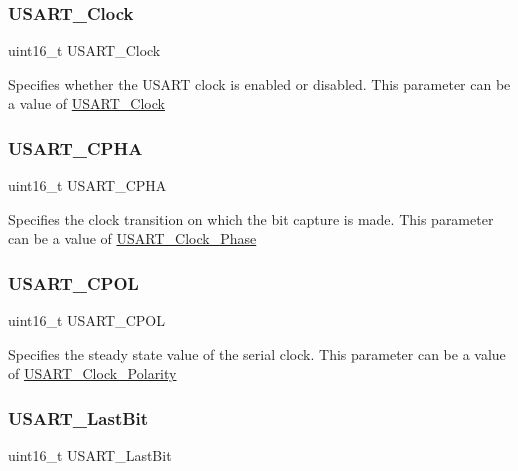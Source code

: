 \subsubsection{\texorpdfstring{USART\_Clock}{USART\_Clock}}
{\footnotesize\ttfamily uint16\+\_\+t U\+S\+A\+R\+T\+\_\+\+Clock}

Specifies whether the U\+S\+A\+RT clock is enabled or disabled. This parameter can be a value of \mbox{\hyperlink{group___u_s_a_r_t___clock}{U\+S\+A\+R\+T\+\_\+\+Clock}} \mbox{\label{struct_u_s_a_r_t___clock_init_type_def_ae8d00e2e6f99439097a1b56cd33dd9f4}} 
\subsubsection{\texorpdfstring{USART\_CPHA}{USART\_CPHA}}
{\footnotesize\ttfamily uint16\+\_\+t U\+S\+A\+R\+T\+\_\+\+C\+P\+HA}

Specifies the clock transition on which the bit capture is made. This parameter can be a value of \mbox{\hyperlink{group___u_s_a_r_t___clock___phase}{U\+S\+A\+R\+T\+\_\+\+Clock\+\_\+\+Phase}} \mbox{\label{struct_u_s_a_r_t___clock_init_type_def_ab6507c7489a2e05e4ef1ade9fbf057d5}} 
\subsubsection{\texorpdfstring{USART\_CPOL}{USART\_CPOL}}
{\footnotesize\ttfamily uint16\+\_\+t U\+S\+A\+R\+T\+\_\+\+C\+P\+OL}

Specifies the steady state value of the serial clock. This parameter can be a value of \mbox{\hyperlink{group___u_s_a_r_t___clock___polarity}{U\+S\+A\+R\+T\+\_\+\+Clock\+\_\+\+Polarity}} \mbox{\label{struct_u_s_a_r_t___clock_init_type_def_a998735e29b6f77d3e993d8d34c74cbca}} 
\subsubsection{\texorpdfstring{USART\_LastBit}{USART\_LastBit}}
{\footnotesize\ttfamily uint16\+\_\+t U\+S\+A\+R\+T\+\_\+\+Last\+Bit}


